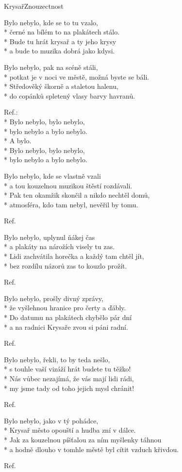 \documentclass[10.5pt]{book}
\newcommand\tab[1][1cm]{\hspace*{#1}}
\begin{document}
\begin{poem}{Krysař}{Znouzectnost}

\settowidth{\versewidth}{a hodně dlouho v tomhle městě byl cítit vzduch křivdou.}

Bylo nebylo, kde se to tu vzalo,\\*
černé na bílém to na plakátech stálo.\\*
Bude tu hrát krysař a ty jeho krysy\\*
a bude to muzika dobrá jako kdysi.

Bylo nebylo, pak na scéně stáli,\\*
potkat je v noci ve městě, možná byste se báli.\\*
Středověký škorně a staletou halenu,\\*
do copánků spletený vlasy barvy havranů.

Ref.:\\*
Bylo nebylo, bylo nebylo,\\*
bylo nebylo a bylo nebylo.\\*
\tab A bylo. \\*
Bylo nebylo, bylo nebylo,\\*
bylo nebylo a bylo nebylo.

Bylo nebylo, kde se vlastně vzali\\*
a tou kouzelnou muzikou štěstí rozdávali.\\*
Pak ten okamžik skončil a nikdo nechtěl domů,\\*
atmosféra, kdo tam nebyl, nevěřil by tomu.

Ref.

Bylo nebylo, uplynul ňákej čas\\*
a plakáty na nárožích visely tu zas.\\*
Lidi zachvátila horečka a každý tam chtěl jít,\\*
bez rozdílu názorů zas to kouzlo prožít.

Ref.

Bylo nebylo, prošly divný zprávy,\\*
že vyšlehnou hranice pro čerty a ďábly.\\*
Do datumu na plakátech chybělo pár dní\\*
a na radnici Krysaře zvou si páni radní.

Ref.

Bylo nebylo, řekli, to by teda nešlo,\\*
s touhle vaší vizáží hrát budete tu těžko!\\*
Nás vůbec nezajímá, že vás mají lidi rádi,\\*
my jsme tady od toho jejich mysl chránit!

Ref.

Bylo nebylo, jako v tý pohádce,\\*
Krysař město opouští a hudba zní v dálce.\\*
Jak za kouzelnou píšťalou za ním myšlenky táhnou\\*
a hodně dlouho v tomhle městě byl cítit vzduch křivdou.

Ref.
\end{poem}
\end{document}
